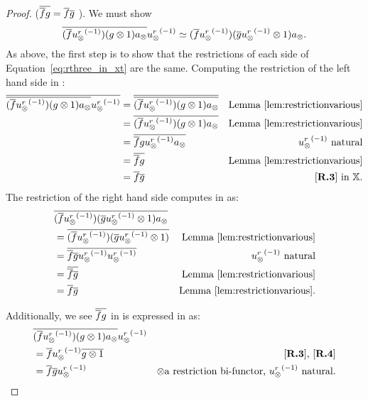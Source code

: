\begin{proof}
    \rthree ($\overline{\overline{f} g} = \overline{f} \overline{g}$ ). We must show
      \begin{equation}
        \overline{(\overline{f} {u_{\otimes}^r}^{(-1)}) (g\otimes 1) a_{\otimes}} {u_{\otimes}^r}^{(-1)} \overset{\scriptscriptstyle }{\simeq}
        (\overline{f} {u_{\otimes}^r}^{(-1)})(\overline{g} {u_{\otimes}^r}^{(-1)}\otimes 1) a_{\otimes}.
        \label{eq:rthree_in_xt}
      \end{equation}
      As above, the first step is
      to show that the restrictions of each side of Equation~\ref{eq:rthree_in_xt} are the same.
      Computing the restriction of the left
      hand side in \X:
      \begin{align*}
        \rst{\restr{(\restr{f} \inv{\usr}) (g\* 1) a_{\*}} \inv{\usr}}
        & = \rst{\restr{(\restr{f} \inv{\usr}) (g\* 1) a_{\*}}} & \text{Lemma \ref{lem:restrictionvarious}}\\
        & = \restr{(\restr{f} \inv{\usr}) (g\* 1) a_{\*}} &
          \text{Lemma \ref{lem:restrictionvarious}}\\
        & = \restr{\restr{f} g \inv{\usr} a_{\*}} & \inv{\usr} \text{ natural}\\
        & = \restr{\restr{f} g } & \text{Lemma \ref{lem:restrictionvarious}}\\
        & = \restr{f} \rst{g} & \text{\rthree in }\X.
      \end{align*}
      The restriction of the right hand side computes in \X as:
      \begin{align*}
        &\overline{(\overline{f} {u_{\otimes}^r}^{(-1)})(\overline{g} {u_{\otimes}^r}^{(-1)}\otimes 1) a_{\otimes}}\\
        & = \overline{(\overline{f} {u_{\otimes}^r}^{(-1)}) (\overline{g} {u_{\otimes}^r}^{(-1)}\otimes 1) } &  \text{Lemma \ref{lem:restrictionvarious}}\\
        & = \overline{\overline{f}  \overline{g} {u_{\otimes}^r}^{(-1)}{u_{\otimes}^r}^{(-1)} } &  {u_{\otimes}^r}^{(-1)} \text{ natural}\\
        & = \overline{\overline{f}  \overline{g} } &\text{Lemma \ref{lem:restrictionvarious}}\\
        & = \overline{f} \overline{g} & \text{Lemma \ref{lem:restrictionvarious}}.
      \end{align*}

      Additionally, we see $\overline{\overline{f} g}$ in \Xt is expressed in \X as:
      \begin{align*}
        &\overline{(\overline{f} {u_{\otimes}^r}^{(-1)})(g\otimes 1) a_{\otimes}} {u_{\otimes}^r}^{(-1)} \\
        & = \overline{f} {u_{\otimes}^r}^{(-1)} \overline{g\otimes 1} & \text{\ensuremath{[\text{\bfseries {R}.{3}}]}, \ensuremath{[\text{\bfseries {R}.{4}}]}} \\
        & = \overline{f} \overline{g} {u_{\otimes}^r}^{(-1)} & \otimes
          \text{a restriction bi-functor, }{\ensuremath{u_{\otimes}^r}}^{(-1)}\text{ natural.}
      \end{align*}


\end{proof}
